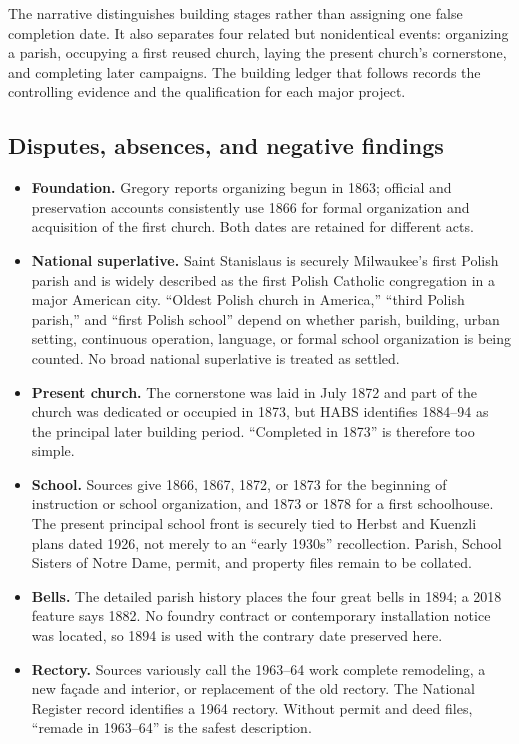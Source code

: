 The narrative distinguishes building stages rather than assigning one false completion date. It also separates four related but nonidentical events: organizing a parish, occupying a first reused church, laying the present church's cornerstone, and completing later campaigns. The building ledger that follows records the controlling evidence and the qualification for each major project.

\subsection{Disputes, absences, and negative findings}

\begin{itemize}[leftmargin=1.45em,itemsep=0.25em,topsep=0.25em]
\item \textbf{Foundation.} Gregory reports organizing begun in 1863; official and preservation accounts consistently use 1866 for formal organization and acquisition of the first church. Both dates are retained for different acts.
\item \textbf{National superlative.} Saint Stanislaus is securely Milwaukee's first Polish parish and is widely described as the first Polish Catholic congregation in a major American city. ``Oldest Polish church in America,'' ``third Polish parish,'' and ``first Polish school'' depend on whether parish, building, urban setting, continuous operation, language, or formal school organization is being counted. No broad national superlative is treated as settled.
\item \textbf{Present church.} The cornerstone was laid in July 1872 and part of the church was dedicated or occupied in 1873, but HABS identifies 1884--94 as the principal later building period. ``Completed in 1873'' is therefore too simple.
\item \textbf{School.} Sources give 1866, 1867, 1872, or 1873 for the beginning of instruction or school organization, and 1873 or 1878 for a first schoolhouse. The present principal school front is securely tied to Herbst and Kuenzli plans dated 1926, not merely to an ``early 1930s'' recollection. Parish, School Sisters of Notre Dame, permit, and property files remain to be collated.
\item \textbf{Bells.} The detailed parish history places the four great bells in 1894; a 2018 feature says 1882. No foundry contract or contemporary installation notice was located, so 1894 is used with the contrary date preserved here.
\item \textbf{Rectory.} Sources variously call the 1963--64 work complete remodeling, a new façade and interior, or replacement of the old rectory. The National Register record identifies a 1964 rectory. Without permit and deed files, ``remade in 1963--64'' is the safest description.

\end{itemize}
